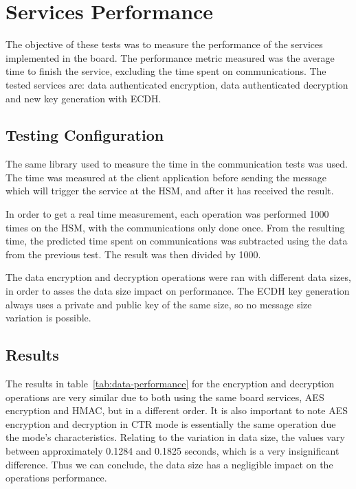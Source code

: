 \section{Services Performance}\label{chap:evaluation:services}

The objective of these tests was to measure the performance of the services implemented in the board.
The performance metric measured was the average time to finish the service, excluding the time spent on communications.
The tested services are: data authenticated encryption, data authenticated decryption and new key generation with \ac{ECDH}.

\subsection{Testing Configuration}\label{chap:evaluation:services:config}

The same library used to measure the time in the communication tests was used.
The time was measured at the client application before sending the message which will trigger the service at the HSM, and after it has received the result.

In order to get a real time measurement, each operation was performed 1000 times on the HSM, with the communications only done once.
From the resulting time, the predicted time spent on communications was subtracted using the data from the previous test. The result was then divided by 1000.

The data encryption and decryption operations were ran with different data sizes, in order to asses the data size impact on performance.
The ECDH key generation always uses a private and public key of the same size, so no message size variation is possible.

\subsection{Results}\label{chap:evaluation:services:results}



The results in table~\ref{tab:data-performance} for the encryption and decryption operations are very similar due to both using the same board services, AES encryption and HMAC, but in a different order. It is also important to note AES encryption and decryption in CTR mode is essentially the same operation due the mode's characteristics.
Relating to the variation in data size, the values vary between approximately 0.1284 and 0.1825 seconds, which is a very insignificant difference. Thus we can conclude, the data size has a negligible impact on the operations performance.

